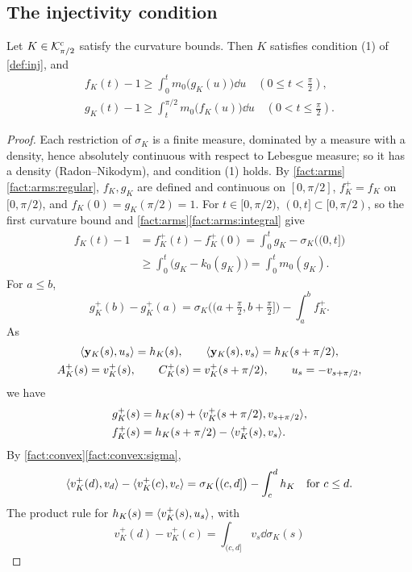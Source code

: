 \subsection{The injectivity condition}

\begin{lemma}\label{lem:integral}
Let $K\in\mathcal{K}^{\mathrm{c}}_{\pi/2}$ satisfy the curvature bounds. Then $K$ satisfies condition
(1) of \cref{def:inj}, and
\begin{gather*}
  f_K(t)-1\ge\int_0^tm_0\bigl(g_K(u)\bigr)\dd u\quad(0\le t<\tfrac\pi2),\\
  g_K(t)-1\ge\int_t^{\pi/2}m_0\bigl(f_K(u)\bigr)\dd u\quad(0<t\le\tfrac\pi2).
\end{gather*}
\end{lemma}

\begin{proof}
Each restriction of $\sigma_K$ is a finite measure, dominated by a measure with
a density, hence absolutely continuous with respect to Lebesgue measure; so it
has a density (Radon--Nikodym), and condition (1) holds. By
\cref{fact:arms}\ref{fact:arms:regular}, $f_K,g_K$ are defined and continuous on
$[0,\pi/2]$, $f_K^+=f_K$ on $[0,\pi/2)$, and $f_K(0)=g_K(\pi/2)=1$. For
$t\in[0,\pi/2)$, $(0,t]\subset[0,\pi/2)$, so the first curvature bound and
\cref{fact:arms}\ref{fact:arms:integral} give
\begin{align*}
  f_K(t)-1&=f_K^+(t)-f_K^+(0)=\int_0^tg_K-\sigma_K\bigl((0,t]\bigr)\\
  &\ge\int_0^t\bigl(g_K-k_0(g_K)\bigr)=\int_0^tm_0(g_K).
\end{align*}
For $a\le b$,
\[
  g_K^+(b)-g_K^+(a)=\sigma_K\bigl((a+\tfrac\pi2,b+\tfrac\pi2]\bigr)
    -\int_a^bf_K^+ .
\]
As
\begin{gather*}
  \langle \mathbf{y}_K(s),u_s\rangle=h_K(s),\qquad\langle \mathbf{y}_K(s),v_s\rangle=h_K(s+\pi/2),\\
  A_K^+(s)=v_K^+(s),\qquad C_K^+(s)=v_K^+(s+\pi/2),\qquad u_s=-v_{s+\pi/2},
\end{gather*}
we have
\begin{align*}
  g_K^+(s)&=h_K(s)+\langle v_K^+(s+\pi/2),v_{s+\pi/2}\rangle,\\
  f_K^+(s)&=h_K(s+\pi/2)-\langle v_K^+(s),v_s\rangle.
\end{align*}
By \cref{fact:convex}\ref{fact:convex:sigma},
\[
  \langle v_K^+(d),v_d\rangle-\langle v_K^+(c),v_c\rangle=\sigma_K\bigl((c,d]\bigr)-\int_c^dh_K
  \quad\text{for }c\le d.
\]
The product rule  for $h_K(s)=\langle v_K^+(s),u_s\rangle$, with
\[
  v_K^+(d)-v_K^+(c)=\int_{(c,d]}v_s\dd\sigma_K(s)
\]
\end{proof}
